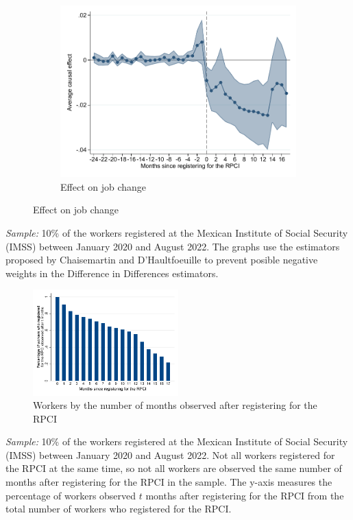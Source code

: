 \documentclass[oneside,11pt]{article}
\begin{document}
\begin{figure}[H]
\begin{center}
    \begin{subfigure}{0.49\textwidth}
    \caption{Effect on job change}
    \includegraphics[width=\textwidth]{04_Figures/muestra_10porciento/event_study_cambio_cierre_chaisemartin.pdf}
    \end{subfigure}
    
    \end{center}
\end{figure}
\scriptsize{
\noindent \textit{Sample:} 10\% of the workers registered at the Mexican Institute of Social Security (IMSS) between January 2020 and August 2022. The graphs use the estimators proposed by Chaisemartin and D'Haultfoeuille to prevent posible negative weights in the Difference in Differences estimators.
}

\clearpage

\begin{figure}[H]
    \caption{Workers by the number of months observed after registering for the RPCI}
    \label{hist_time_since_treated}
    \begin{center}
    \includegraphics[width=0.5\textwidth]{04_Figures/muestra_10porciento/hist_time_since_treated.pdf}
    \end{center}
\end{figure}
\scriptsize{
\noindent \textit{Sample:} 10\% of the workers registered at the Mexican Institute of Social Security (IMSS) between January 2020 and August 2022. Not all workers registered for the RPCI at the same time, so not all workers are observed the same number of months after registering for the RPCI in the sample. The y-axis measures the percentage of workers observed $t$ months after registering for the RPCI from the total number of workers who registered for the RPCI.
}
\end{document}
